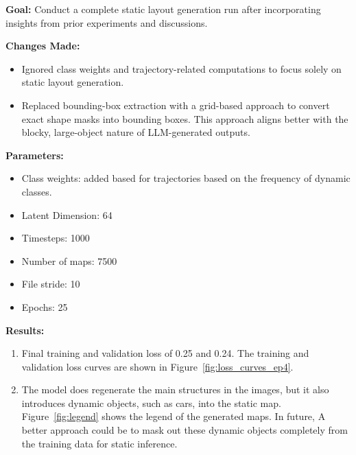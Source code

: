 \documentclass{article}
\begin{document}
\textbf{Goal:} Conduct a complete static layout generation run after incorporating insights from prior experiments and discussions.

\textbf{Changes Made:}
\begin{itemize}
    \item Ignored class weights and trajectory-related computations to focus solely on static layout generation.
    \item Replaced bounding-box extraction with a grid-based approach to convert exact shape masks into bounding boxes. This approach aligns better with the blocky, large-object nature of LLM-generated outputs.
\end{itemize}

\textbf{Parameters:}
\begin{itemize}
    \item Class weights: added based for trajectories based on the frequency of dynamic classes.
    \item Latent Dimension: 64
    \item Timesteps: 1000
    \item Number of maps: 7500 
    \item File stride: 10
    \item Epochs: 25
\end{itemize}


\textbf{Results:}
\begin{enumerate}
    \item Final training and validation loss of 0.25 and 0.24. The training and validation loss curves are shown in Figure~\ref{fig:loss_curves_ep4}.

    \item The model does regenerate the main structures in the images, but it also introduces dynamic objects, such as cars, into the static map. Figure~\ref{fig:legend} shows the legend of the generated maps. In future, A better approach could be to mask out these dynamic objects completely from the training data for static inference.
\end{enumerate}
\end{document}

